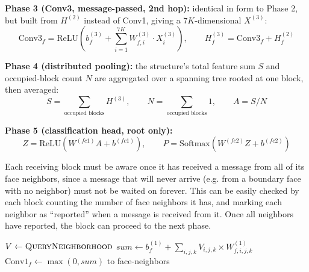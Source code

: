 \documentclass[12pt]{article}
\begin{document}
\textbf{Phase 3 (Conv3, message-passed, 2nd hop):} identical in form to Phase 2, but built from $H^{(2)}$ instead of Conv1, giving a $7K$-dimensional $X^{(3)}$:
\begin{equation}
\text{Conv3}_f = \mathrm{ReLU}\left(b^{(3)}_f + \sum_{i=1}^{7K} W^{(3)}_{f,i} \cdot X^{(3)}_i\right), \qquad H^{(3)}_f = \text{Conv3}_f + H^{(2)}_f
\label{eq:conv3}
\end{equation}

\textbf{Phase 4 (distributed pooling):} the structure's total feature sum $S$ and occupied-block count $N$ are aggregated over a spanning tree rooted at one block, then averaged:
\begin{equation}
S = \sum_{\text{occupied blocks}} H^{(3)}, \qquad N = \sum_{\text{occupied blocks}} 1, \qquad A = S / N
\label{eq:pool}
\end{equation}

\textbf{Phase 5 (classification head, root only):}
\begin{equation}
Z = \mathrm{ReLU}(W^{(fc1)} A + b^{(fc1)}), \qquad P = \mathrm{Softmax}(W^{(fc2)} Z + b^{(fc2)})
\label{eq:fc}
\end{equation}

Each receiving block must be aware once it has received a message from all of its face neighbors, since a message that will never arrive (e.g. from a boundary face with no neighbor) must not be waited on forever. This can be easily checked by each block counting the number of face neighbors it has, and marking each neighbor as ``reported'' when a message is received from it. Once all neighbors have reported, the block can proceed to the next phase.


\begin{algorithm}[tb]
\caption{Phase 1: Local Feature Extraction (Conv1)}
\label{alg:phase1}
\begin{algorithmic}[1]
    \State $V \gets \Call{QueryNeighborhood}{}$ 
        \State $sum \gets b^{(1)}_f + \sum_{i,j,k} V_{i,j,k} \times W^{(1)}_{f,i,j,k}$
        \State $\text{Conv1}_f \gets \max(0, sum)$
    \EndFor
        \State {}
    \EndIf
    \State {} to face-neighbors
\EndFunction
\end{algorithmic}
\end{algorithm}
\end{document}
